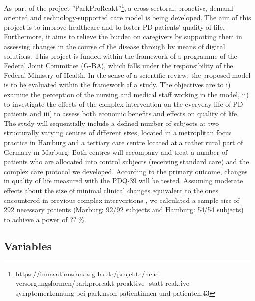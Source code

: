 \documentclass[number,12pt,review]{elsarticle}
\begin{document}
As part of the project ”ParkProReakt”\footnote{https://innovationsfonds.g-ba.de/projekte/neue-versorgungsformen/parkproreakt-proaktive-
statt-reaktive-symptomerkennung-bei-parkinson-patientinnen-und-patienten.43}, a cross-sectoral, proactive, demand-oriented and technology-supported care model is being developed. The aim of this project is to improve healthcare and to foster \ac{PD}-patients' quality of life. Furthermore, it aims to relieve the burden on caregivers by supporting them in assessing changes in the course of the disease through by means of digital solutions. This project is funded within the framework of a programme of the Federal Joint Committee (\ac{G-BA}), which falls under the responsibility of the Federal Ministry of Health. In the sense of a scientific review, the proposed model is to be evaluated within the framework of a study. The objectives are to i) examine the perception of the nursing and medical staff working in the model, ii) to investigate the effects of the complex intervention on the everyday life of \ac{PD}-patients and iii) to assess both economic benefits and effects on quality of life. The study will sequentially include a defined number of subjects at two structurally varying centres of different sizes, located in a metroplitan focus practice in Hamburg and a tertiary care centre located at a rather rural part of Germany in Marburg. Both centres will accompany and treat a number of patients who are allocated into control subjects (receiving standard care) and the complex care protocol we developed. According to the primary outcome, changes in quality of life measured with the \ac{PDQ-39} \citep{jenkinson1997parkinson} will be tested. Assuming moderate effects about the size of minimal clinical changes \citep{horvath2017changes} equivalent to the ones encountered in previous complex interventions \citep{Butterfield2017-uc, Mestre2021-od}, we calculated a sample size of 292 necessary patients (Marburg: 92/92 subjects and Hamburg: 54/54 subjects) to achieve a power of ?? \%.

\subsection{Variables}
\label{varsec}
\end{document}
